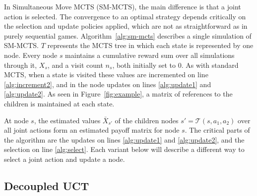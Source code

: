 \documentclass[conference]{IEEEtran}
\newcommand{\cA}{\mathcal{A}}
\newcommand{\cT}{\mathcal{T}}
\begin{document}
In Simultaneous Move MCTS (SM-MCTS), the main difference is that a joint action is selected. The convergence to an 
optimal strategy depends critically on the selection and update policies applied, which are not as straightforward 
as in purely sequential games. 
Algorithm~\ref{alg:sm-mcts} describes a single simulation of SM-MCTS. 
$T$ represents the MCTS tree in which each state is represented by one node. Every node $s$ maintains a 
cumulative reward sum over all simulations through it, $X_s$, and a visit count $n_s$, both initially set to 0. 
As with standard MCTS, when a state is visited these values are incremented on line \ref{alg:increment2}, and in the node 
updates on lines \ref{alg:update1} and \ref{alg:update2}. 
As seen in Figure~\ref{fig:example}, a matrix of references to the children is maintained at each state. 

At node $s$, the estimated values $\bar{X}_{s'}$ of the children nodes $s' = \cT(s,a_1,a_2)$ over all 
joint actions form an estimated payoff matrix for node $s$. 
The critical parts of the algorithm are the updates on lines \ref{alg:update1} and \ref{alg:update2}, and the selection 
on line \ref{alg:select}. Each variant below will describe a different way to select a joint action and update a node. 


\subsection{Decoupled UCT} 
\end{document}
